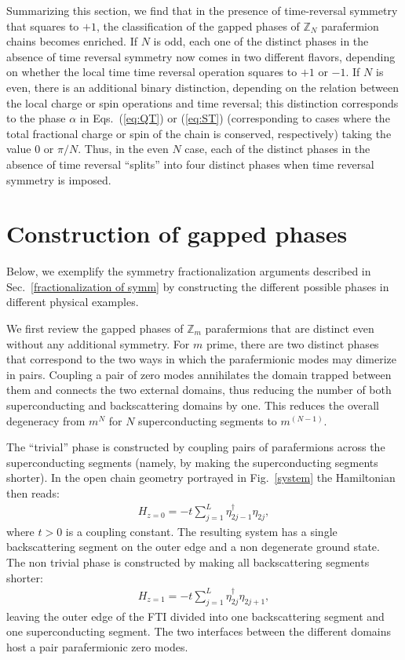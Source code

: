 \documentclass[twocolumn,aps,prb,showpacs]{revtex4-1}
\begin{document}
Summarizing this section, we find that in the presence of time-reversal symmetry that squares to $+1$, the classification of the gapped phases of $\mathbb{Z}_N$ parafermion chains becomes enriched. If $N$ is odd, each one of the distinct phases in the absence of time reversal symmetry now comes in two different flavors, depending on whether the local time time reversal operation squares to $+1$ or $-1$. If $N$ is even, there is an additional binary distinction, depending on the relation between the local charge or spin operations and time reversal; this distinction corresponds to the phase $\alpha$ in Eqs.~(\ref{eq:QT}) or (\ref{eq:ST}) (corresponding to cases where the total fractional charge or spin of the chain is conserved, respectively) taking the value $0$ or $\pi/N$. Thus, in the even $N$ case, each of the distinct phases in the absence of time reversal ``splits'' into four distinct phases when time reversal symmetry is imposed.




\section{Construction of gapped phases}\label{construction}

Below, we exemplify the symmetry fractionalization arguments described in Sec.~\ref{fractionalization of symm} by constructing the different possible phases in different physical examples. 

We first review the gapped phases of $\mathbb{Z}_m$ parafermions that are distinct even without any additional symmetry.
For $m$ prime, there are two distinct phases that correspond to the two ways in which the parafermionic modes may dimerize in pairs. Coupling a pair of zero modes annihilates  the domain trapped between them  and connects the two external domains, thus reducing the number of both superconducting and backscattering domains by one. This reduces the overall degeneracy from $m^N $ for $ N$ superconducting  segments  to $m^{(N-1)}$.

The ``trivial'' phase is constructed by coupling pairs of parafermions across the superconducting segments (namely, by making the superconducting segments shorter).  In the open chain geometry portrayed in Fig.~\ref{system} the Hamiltonian then reads:
 \begin{align}
H_{z=0} = -t \sum_{j=1}^L \eta_{2j-1}^\dag\eta_{2j},
\end{align}
where $t>0$ is a coupling constant. The resulting system has a single  backscattering segment on the outer edge and a non degenerate ground state. The non trivial phase is constructed by making all backscattering segments shorter:
\begin{align}
H_{z=1} = -t \sum_{j=1}^L \eta_{2j}^\dag\eta_{2j+1},
\end{align}
leaving the  outer edge of the FTI divided into one backscattering segment and one superconducting segment. The two interfaces between the different domains  host a pair parafermionic zero modes.
\end{document}
